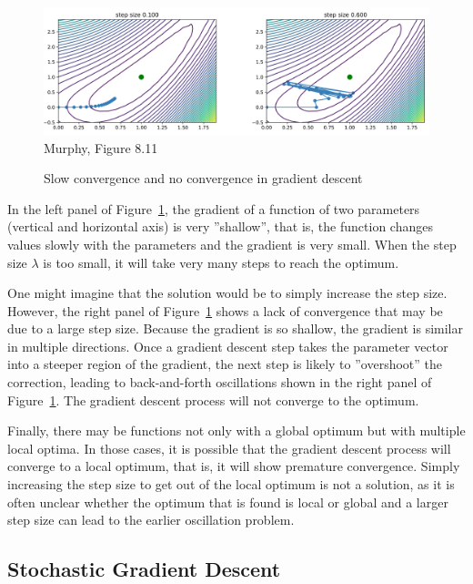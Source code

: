 \begin{figure}
\centering
\includegraphics[width=\linewidth]{screen4} \\

\scriptsize Murphy, Figure 8.11
\caption{Slow convergence and no convergence in gradient descent}
\label{fig:screen4_chap15}
\end{figure}

In the left panel of Figure~\ref{fig:screen4_chap15}, the gradient of a function of two parameters (vertical and horizontal axis) is very ''shallow'', that is, the function changes values slowly with the parameters and the gradient is very small. When the step size $\lambda$ is too small, it will take very many steps to reach the optimum. 

One might imagine that the solution would be to simply increase the step size. However, the right panel of Figure~\ref{fig:screen4_chap15} shows a lack of convergence that may be due to a large step size. Because the gradient is so shallow, the gradient is similar in multiple directions. Once a gradient descent step takes the parameter vector into a steeper region of the gradient, the next step is likely to ''overshoot'' the correction, leading to back-and-forth oscillations shown in the right panel of Figure~\ref{fig:screen4_chap15}. The gradient descent process will not converge to the optimum. 

Finally, there may be functions not only with a global optimum but with multiple local optima. In those cases, it is possible that the gradient descent process will converge to a local optimum, that is, it will show premature convergence. Simply increasing the step size to get out of the local optimum is not a solution, as it is often unclear whether the optimum that is found is local or global and a larger step size can lead to the earlier oscillation problem.

\subsection{Stochastic Gradient Descent}

